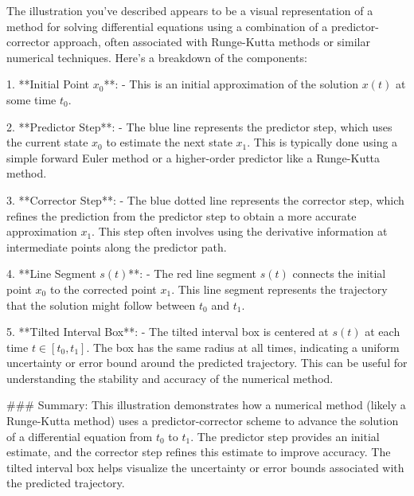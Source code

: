 The illustration you've described appears to be a visual representation of a method for solving differential equations using a combination of a predictor-corrector approach, often associated with Runge-Kutta methods or similar numerical techniques. Here's a breakdown of the components:

1. **Initial Point \( x_0 \)**:
   - This is an initial approximation of the solution \( x(t) \) at some time \( t_0 \).

2. **Predictor Step**:
   - The blue line represents the predictor step, which uses the current state \( x_0 \) to estimate the next state \( x_1 \). This is typically done using a simple forward Euler method or a higher-order predictor like a Runge-Kutta method.

3. **Corrector Step**:
   - The blue dotted line represents the corrector step, which refines the prediction from the predictor step to obtain a more accurate approximation \( x_1 \). This step often involves using the derivative information at intermediate points along the predictor path.

4. **Line Segment \( s(t) \)**:
   - The red line segment \( s(t) \) connects the initial point \( x_0 \) to the corrected point \( x_1 \). This line segment represents the trajectory that the solution might follow between \( t_0 \) and \( t_1 \).

5. **Tilted Interval Box**:
   - The tilted interval box is centered at \( s(t) \) at each time \( t \in [t_0, t_1] \). The box has the same radius at all times, indicating a uniform uncertainty or error bound around the predicted trajectory. This can be useful for understanding the stability and accuracy of the numerical method.

### Summary:
This illustration demonstrates how a numerical method (likely a Runge-Kutta method) uses a predictor-corrector scheme to advance the solution of a differential equation from \( t_0 \) to \( t_1 \). The predictor step provides an initial estimate, and the corrector step refines this estimate to improve accuracy. The tilted interval box helps visualize the uncertainty or error bounds associated with the predicted trajectory.